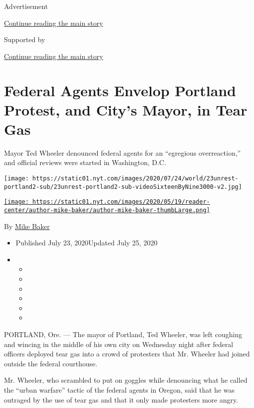 Advertisement

\protect\hyperlink{after-top}{Continue reading the main story}

Supported by

\protect\hyperlink{after-sponsor}{Continue reading the main story}

\hypertarget{federal-agents-envelop-portland-protest-and-citys-mayor-in-tear-gas}{%
\section{Federal Agents Envelop Portland Protest, and City's Mayor, in
Tear
Gas}\label{federal-agents-envelop-portland-protest-and-citys-mayor-in-tear-gas}}

Mayor Ted Wheeler denounced federal agents for an ``egregious
overreaction,'' and official reviews were started in Washington, D.C.

\texttt{[image: https://static01.nyt.com/images/2020/07/24/world/23unrest-portland2-sub/23unrest-portland2-sub-videoSixteenByNine3000-v2.jpg]}

\href{https://www.nytimes.com/by/mike-baker}{\texttt{[image: https://static01.nyt.com/images/2020/05/19/reader-center/author-mike-baker/author-mike-baker-thumbLarge.png]}}

By \href{https://www.nytimes.com/by/mike-baker}{Mike Baker}

\begin{itemize}
\item
  Published July 23, 2020Updated July 25, 2020
\item
  \begin{itemize}
  \item
  \item
  \item
  \item
  \item
  \item
  \end{itemize}
\end{itemize}

PORTLAND, Ore. --- The mayor of Portland, Ted Wheeler, was left coughing
and wincing in the middle of his own city on Wednesday night after
federal officers deployed tear gas into a crowd of protesters that Mr.
Wheeler had joined outside the federal courthouse.

Mr. Wheeler, who scrambled to put on goggles while denouncing what he
called the ``urban warfare'' tactic of the federal agents in Oregon,
said that he was outraged by the use of tear gas and that it only made
protesters more angry.

